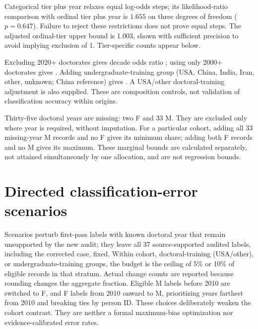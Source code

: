 \documentclass[11pt]{article}
\begin{document}
Categorical tier plus year relaxes equal log-odds steps; its likelihood-ratio comparison with ordinal tier plus year is $1.655$ on three degrees of freedom ($p=0.647$). Failure to reject these restrictions does not prove equal steps. The adjusted ordinal-tier upper bound is 1.003, shown with sufficient precision to avoid implying exclusion of 1. Tier-specific counts appear below.

\begin{table}[ht]\centering\small\caption{Current-institution tier composition.}\end{table}

Excluding 2020+ doctorates gives decade odds ratio \PreTwentyOR; using only 2000+ doctorates gives \RecentOR. Adding undergraduate-training group (USA, China, India, Iran, other, unknown; China reference) gives \UGAdjustedOR. A USA/other doctoral-training adjustment is also supplied. These are composition controls, not validation of classification accuracy within origins.

Thirty-five doctoral years are missing: two F and 33 M. They are excluded only where year is required, without imputation. For a particular cohort, adding all 33 missing-year M records and no F gives its minimum share; adding both F records and no M gives its maximum. These marginal bounds are calculated separately, not attained simultaneously by one allocation, and are not regression bounds.

\begin{table}[ht]\centering\small\caption{Marginal bounds from missing doctoral years, conditional on gender classifications.}\end{table}

\begin{table}[p]\centering\scriptsize
\caption{All fitted models. CSV output supplies full design-matrix labels; clustered denotes institution-clustered intervals.}
\resizebox{\textwidth}{!}{}
\end{table}

\section{Directed classification-error scenarios}\label{sec:errors}
Scenarios perturb first-pass labels with known doctoral year that remain unsupported by the new audit; they leave all 37 source-supported audited labels, including the corrected case, fixed. Within cohort, doctoral-training (USA/other), or undergraduate-training groups, the budget is the ceiling of 5\% or 10\% of eligible records in that stratum. Actual change counts are reported because rounding changes the aggregate fraction. Eligible M labels before 2010 are switched to F, and F labels from 2010 onward to M, prioritizing years farthest from 2010 and breaking ties by person ID. These choices deliberately weaken the cohort contrast. They are neither a formal maximum-bias optimization nor evidence-calibrated error rates.
\end{document}

